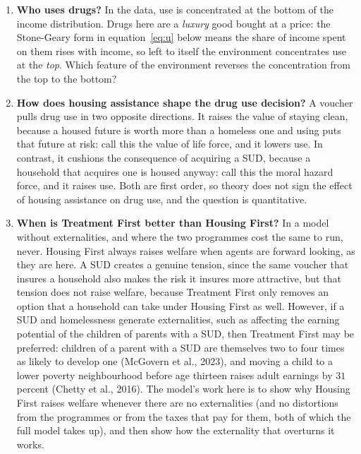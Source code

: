 \documentclass[10pt]{article}
\begin{document}
\begin{enumerate}\setlength{\itemsep}{0.3em}\setlength{\parskip}{0em}

\item \textbf{Who uses drugs?} In the data, use is concentrated at the bottom of
the income distribution. Drugs here are a \emph{luxury} good bought at a
price: the Stone-Geary form in equation~\eqref{eq:u} below means the share of
income spent on them rises with income, so left to itself the environment
concentrates use at the \emph{top}. Which feature of the environment reverses
the concentration from the top to the bottom?

\item \textbf{How does housing assistance shape the drug use decision?} A
voucher pulls drug use in two opposite directions. It raises the value of
staying clean, because a housed future is worth more than a homeless one and
using puts that future at risk: call this the value of life force, and it lowers
use. In contrast, it cushions the consequence of acquiring a SUD, because
a household that acquires one is housed anyway: call this the moral hazard
force, and it raises use. Both are first order, so theory does not sign the
effect of housing assistance on drug use, and the question is quantitative.

\item \textbf{When is Treatment First better than Housing First?} In a model
without externalities, and where the two programmes cost the same to
run, never. Housing First always raises welfare when agents
are forward looking, as they are here. A SUD creates a genuine tension,
since the same voucher that insures a household also makes the risk it insures
more attractive, but that tension does not raise welfare, because Treatment
First only removes an option that a household can take under Housing First as
well. However, if a SUD and homelessness generate externalities, such
as affecting the earning potential of the children of parents with a SUD, then
Treatment First may be preferred: children of a parent with a SUD are
themselves two to four times as likely to develop one (McGovern et al., 2023),
and moving a child to a lower poverty neighbourhood before age thirteen raises
adult earnings by $31$ percent (Chetty et al., 2016). The
model's work here is to show why Housing First raises welfare whenever
there are no externalities (and no distortions from the programmes or
from the taxes that pay for them, both of which the full model takes up),
and then show how the externality that overturns it works.

\end{enumerate}
\end{document}
